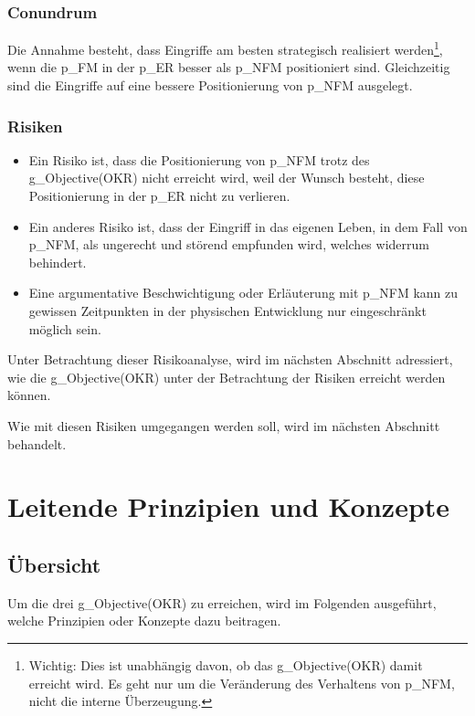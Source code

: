 \subsubsection{Conundrum} Die Annahme besteht, dass Eingriffe am besten strategisch realisiert werden\footnote{
	Wichtig: Dies ist unabhängig davon, ob das \gls{g_Objective(OKR)} damit erreicht wird. Es geht nur um die Veränderung des Verhaltens von \gls{p_NFM}, nicht die interne Überzeugung.
}, wenn die \gls{p_FM} in der \gls{p_ER} besser als \gls{p_NFM} positioniert sind. Gleichzeitig sind die Eingriffe auf eine bessere Positionierung von \gls{p_NFM} ausgelegt.\\


\subsubsection{Risiken}
\begin{itemize}
	\item Ein Risiko ist, dass die Positionierung von \gls{p_NFM} trotz des \gls{g_Objective(OKR)} nicht erreicht wird, weil der Wunsch besteht, diese Positionierung in der \gls{p_ER} nicht zu verlieren. 
	\item Ein anderes Risiko ist, dass der Eingriff in das eigenen Leben, in dem Fall von \gls{p_NFM}, als ungerecht und störend empfunden wird, welches widerrum \NFMOTwo behindert.
	\item Eine argumentative Beschwichtigung oder Erläuterung mit \gls{p_NFM} kann zu gewissen Zeitpunkten in der physischen Entwicklung nur eingeschränkt möglich sein.
\end{itemize}

Unter Betrachtung dieser Risikoanalyse, wird im nächsten Abschnitt adressiert, wie die \gls{g_Objective(OKR)} unter der Betrachtung der Risiken erreicht werden können.

Wie mit diesen Risiken umgegangen werden soll, wird im nächsten Abschnitt behandelt.

\section{Leitende Prinzipien und Konzepte}\label{sec:Erreichung}
\subsection{Übersicht}
Um die drei \gls{g_Objective(OKR)} zu erreichen, wird im Folgenden ausgeführt, welche Prinzipien oder Konzepte dazu beitragen.\\

